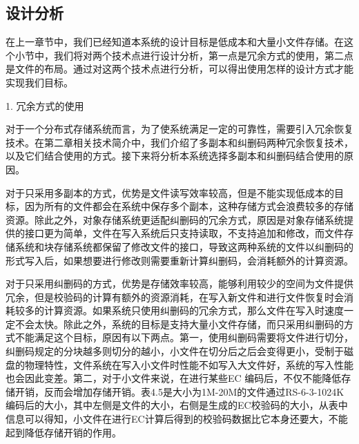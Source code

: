 \subsection{设计分析}
在上一章节中，我们已经知道本系统的设计目标是低成本和大量小文件存储。在这个小节中，我们将对两个技术点进行设计分析，第一点是冗余方式的使用，第二点是文件的布局。通过对这两个技术点进行分析，可以得出使用怎样的设计方式才能实现我们目标。

1. 冗余方式的使用

对于一个分布式存储系统而言，为了使系统满足一定的可靠性，需要引入冗余恢复技术。在第二章相关技术简介中，我们介绍了多副本和纠删码两种冗余恢复技术，以及它们结合使用的方式。接下来将分析本系统选择多副本和纠删码结合使用的原因。

对于只采用多副本的方式，优势是文件读写效率较高，但是不能实现低成本的目标，因为所有的文件都会在系统中保存多个副本，这种存储方式会浪费较多的存储资源。除此之外，对象存储系统更适配纠删码的冗余方式，原因是对象存储系统提供的接口更为简单，文件在写入系统后只支持读取，不支持追加和修改，而文件存储系统和块存储系统都保留了修改文件的接口，导致这两种系统的文件以纠删码的形式写入后，如果想要进行修改则需要重新计算纠删码，会消耗额外的计算资源。

对于只采用纠删码的方式，优势是存储效率较高，能够利用较少的空间为文件提供冗余，但是校验码的计算有额外的资源消耗，在写入新文件和进行文件恢复时会消耗较多的计算资源。如果系统只使用纠删码的冗余方式，那么文件在写入时速度一定不会太快。除此之外，系统的目标是支持大量小文件存储，而只采用纠删码的方式不能满足这个目标，原因有以下两点。第一，使用纠删码需要将文件进行切分，纠删码规定的分块越多则切分的越小，小文件在切分后之后会变得更小，受制于磁盘的物理特性，文件系统在写入小文件时性能不如写入大文件好，系统的写入性能也会因此变差。第二，对于小文件来说，在进行某些EC 编码后，不仅不能降低存储开销，反而会增加存储开销。表4.5是大小为1M-20M的文件通过RS-6-3-1024K编码后的大小，其中左侧是文件的大小，右侧是生成的EC校验码的大小，从表中信息可以得知，小文件在进行EC计算后得到的校验码数据比它本身还要大，不能起到降低存储开销的作用。

